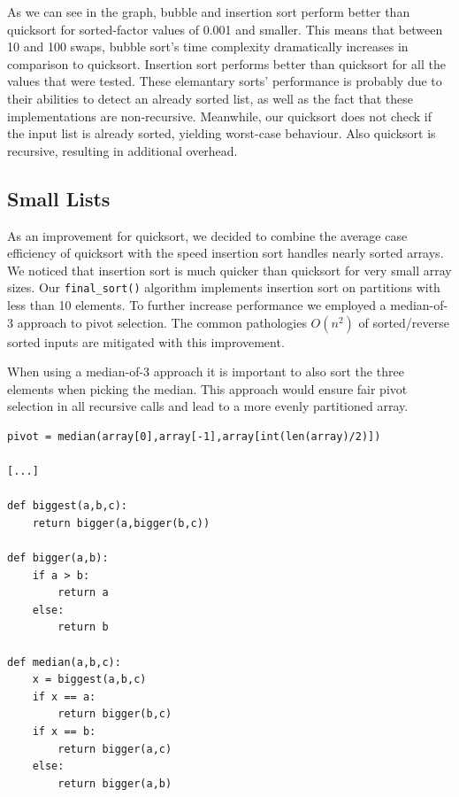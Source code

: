\documentclass[12pt]{article}
\begin{document}
\noindent As we can see in the graph, bubble and insertion sort perform better than quicksort for sorted-factor values of 0.001 and smaller. This means that between 10 and 100 swaps, bubble sort's time complexity dramatically increases in comparison to quicksort. Insertion sort performs better than quicksort for all the values that were tested. These elemantary sorts' performance is probably due to their abilities to detect an already sorted list, as well as the fact that these implementations are non-recursive. Meanwhile, our quicksort does not check if the input list is already sorted, yielding worst-case behaviour. Also quicksort is recursive, resulting in additional overhead.

\subsection{Small Lists}

As an improvement for quicksort, we decided to combine the average case efficiency of quicksort with the speed insertion sort handles nearly sorted arrays. We noticed that insertion sort is much quicker than quicksort for very small array sizes. Our \verb+final_sort()+ algorithm implements insertion sort on partitions with less than 10 elements. To further increase performance we employed a median-of-3 approach to pivot selection. The common pathologies $O(n^2)$ of sorted/reverse sorted inputs are mitigated with this improvement. 

When using a median-of-3 approach it is important to also sort the three elements when picking the median. This approach would ensure fair pivot selection in all recursive calls and lead to a more evenly partitioned array.

\footnotesize
\begin{verbatim}
pivot = median(array[0],array[-1],array[int(len(array)/2)])

[...]

def biggest(a,b,c):
    return bigger(a,bigger(b,c))

def bigger(a,b):
    if a > b:
        return a
    else:
        return b

def median(a,b,c):
    x = biggest(a,b,c)
    if x == a:
        return bigger(b,c)
    if x == b:
        return bigger(a,c)
    else:
        return bigger(a,b)
\end{verbatim}
\normalsize
\end{document}
